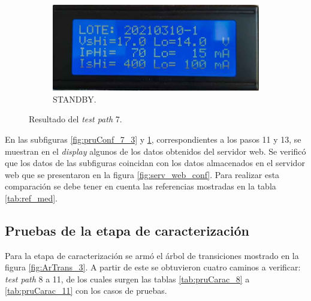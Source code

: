 \begin{figure}[!htpb]
           \hfill
     \begin{subfigure}[b]{0.4\textwidth}
         \centering
         \includegraphics[width=1.1\textwidth]{./Figures/pru_fail.jpeg}
         \caption{STANDBY.}
         \label{fig:pruConf_7_4}
     \end{subfigure}
        \caption{Resultado del \textit{test path} 7.}
        \label{fig:pruConf_7_res}
\end{figure}

En las subfiguras \ref{fig:pruConf_7_3} y \ref{fig:pruConf_7_4}, correspondientes a los pasos 11 y 13, se muestran en el \textit{display} algunos de los datos obtenidos del servidor web. Se verificó que los datos de las subfiguras coincidan con los datos almacenados en el servidor web que se presentaron en la figura \ref{fig:serv_web_conf}. Para realizar esta comparación se debe tener en cuenta las referencias mostradas en la tabla \ref{tab:ref_med}.

\subsection{Pruebas de la etapa de caracterización}

Para la etapa de caracterización se armó el árbol de transiciones mostrado en la figura \ref{fig:ArTrans_3}. A partir de este se obtuvieron cuatro caminos a verificar: \textit{test path} 8 a 11, de los cuales surgen las tablas \ref{tab:pruCarac_8} a \ref{tab:pruCarac_11} con los casos de pruebas.

